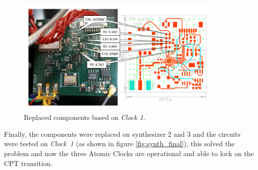 \documentclass[a4paper,12pt]{article}
\begin{document}
\begin{figure}[!h]
    \centering
    \includegraphics[width=0.9\textwidth]{Images/Synthesizer 1 - Components}
    \captionsetup{justification=centering}
    \caption{Replaced components based on \textit{Clock 1}.} 
    \label{fig:components_replacement}
\end{figure}

Finally, the components were replaced on synthesizer 2 and 3 and the circuits were tested on \mbox{\textit{Clock 1}} (as shown in figure \ref{fig:synth_final}), this solved the problem and now the three Atomic Clocks are operational and able to lock on the CPT transition.
\end{document}
